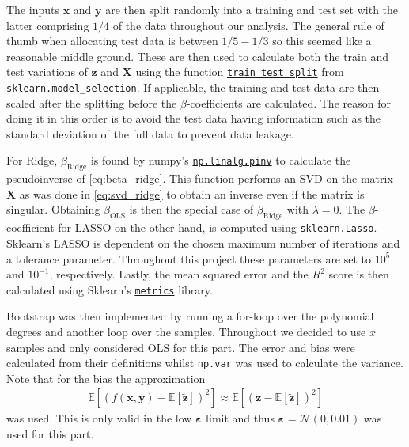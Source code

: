 \documentclass[%
reprint,
amsmath,amssymb,
aps,
pra,
]{revtex4-2}
\begin{document}
The inputs $\bm x$ and $\bm y$ are then split randomly into a training and test set with the latter comprising \(1/4\) of the data throughout our analysis. The general rule of thumb when allocating test data is between $1/5-1/3$ so this seemed like a reasonable middle ground. These are then used to calculate both the train and test variations of $\bm z$ and $\bm X$ using the function \href{https://scikit-learn.org/stable/modules/generated/sklearn.model_selection.train_test_split.html}{\texttt{train\_test\_split}} from \texttt{sklearn.model\_selection}. If applicable, the training and test data are then scaled after the splitting before the \(\beta\)-coefficients are calculated. The reason for doing it in this order is to avoid the test data having information such as the standard deviation of the full data to prevent data leakage.

For Ridge, \(\beta_{\text{Ridge}}\) is found by numpy's \href{https://numpy.org/doc/2.0/reference/generated/numpy.linalg.pinv.html}{\texttt{np.linalg.pinv}} to calculate the pseudoinverse of \eqref{eq:beta_ridge}. This function performs an SVD on the matrix $\bm X$ as was done in \eqref{eq:svd_ridge} to obtain an inverse even if the matrix is singular. Obtaining \(\beta_{\text{OLS}}\) is then the special case of \(\beta_{\text{Ridge}}\) with \(\lambda=0\). The \(\beta\)-coefficient for LASSO on the other hand, is computed using \href{https://scikit-learn.org/stable/modules/generated/sklearn.linear_model.Lasso.html}{\texttt{sklearn.Lasso}}. 
Sklearn's LASSO is dependent on the chosen maximum number of iterations and a tolerance parameter. Throughout this project these parameters are set to \(10^5\) and \(10^{-1}\), respectively. Lastly, the mean squared error and the $R^2$ score is then calculated using Sklearn's \href{https://scikit-learn.org/stable/modules/model_evaluation.html}{\texttt{metrics}} library.

Bootstrap was then implemented by running a for-loop over the polynomial degrees and another loop over the samples. Throughout we decided to use $x$ samples and only considered OLS for this part. The error and bias were calculated from their definitions whilst \texttt{np.var} was used to calculate the variance. Note that for the bias the approximation
\begin{align}
	\mathbb E[(f(\bm x,\bm y)-\mathbb E[\tilde{\bm{z}}])^2]\approx \mathbb E[(\bm z-\mathbb E[\tilde{\bm{z}}])^2]
\end{align}
was used. This is only valid in the low $\bm \varepsilon$ limit and thus $\bm\varepsilon=\mathcal{N}(0, 0.01)$ was used for this part.
\end{document}
